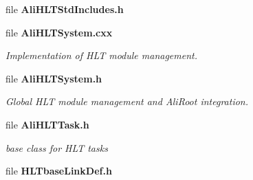 \begin{CompactItemize}
\item 
file {\bf Ali\-HLTStd\-Includes.h}
\item 
file {\bf Ali\-HLTSystem.cxx}
\begin{CompactList}\small\item\em Implementation of HLT module management. \item\end{CompactList}

\item 
file {\bf Ali\-HLTSystem.h}
\begin{CompactList}\small\item\em Global HLT module management and Ali\-Root integration. \item\end{CompactList}

\item 
file {\bf Ali\-HLTTask.h}
\begin{CompactList}\small\item\em base class for HLT tasks \item\end{CompactList}

\item 
file {\bf HLTbase\-Link\-Def.h}
\end{CompactItemize}
